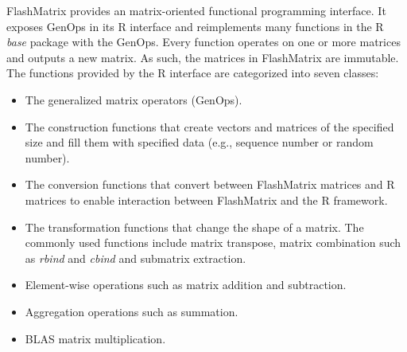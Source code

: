 FlashMatrix provides an matrix-oriented functional programming interface.
It exposes GenOps in its R interface and reimplements many functions
in the R \textit{base} package with the GenOps. Every function operates on
one or more matrices and outputs a new matrix. As such, the matrices in
FlashMatrix are immutable. The functions provided by the R interface are
categorized into seven classes:
\begin{itemize}
	\item The generalized matrix operators (GenOps).
	\item The construction functions that create vectors and matrices of
		the specified size and fill them with specified data (e.g., sequence
		number or random number).
	\item The conversion functions that convert between FlashMatrix matrices and
		R matrices to enable interaction between FlashMatrix and the R framework.
	\item The transformation functions that change the shape of a matrix.
		The commonly used functions include matrix transpose, matrix combination
		such as \textit{rbind} and \textit{cbind} and submatrix extraction.
	\item Element-wise operations such as matrix addition and subtraction.
	\item Aggregation operations such as summation.
	\item BLAS matrix multiplication.
\end{itemize}




